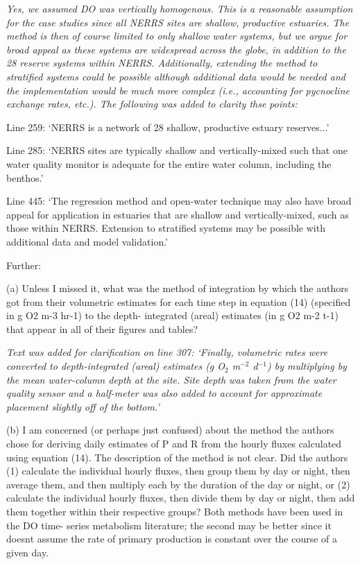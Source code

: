 \documentclass[letterpaper,12pt]{article}\usepackage[]{graphicx}\usepackage[]{color}
\begin{document}
{\it Yes, we assumed DO was vertically homogenous.  This is a reasonable assumption for the case studies since all NERRS sites are shallow, productive estuaries.  The method is then of course limited to only shallow water systems, but we argue for broad appeal as these systems are widespread across the globe, in addition to the 28 reserve systems within NERRS.  Additionally, extending the method to stratified systems could be possible although additional data would be needed and the implementation would be much more complex (i.e., accounting for pycnocline exchange rates, etc.).  The following was added to clarity thse points:

Line 259: `NERRS is a network of 28 shallow, productive estuary reserves...'

Line 285: `NERRS sites are typically shallow and vertically-mixed such that one water quality monitor is adequate for the entire water column, including the benthos.'

Line 445: `The regression method and open-water technique may also have broad appeal for application in estuaries that are shallow and vertically-mixed, such as those within NERRS. Extension to stratified systems may be possible with additional data and model validation.'   
}

Further:

(a) Unless I missed it, what was the method of integration by which the authors got from their volumetric estimates for each time step in equation (14) (specified in g O2 m-3 hr-1) to the depth- integrated (areal) estimates (in g O2 m-2 t-1) that appear in all of their figures and tables?

{\it Text was added for clarification on line 307: `Finally, volumetric rates were converted to depth-integrated (areal) estimates (g O$_2$ m$^{-2}$ d$^{-1}$) by multiplying by the mean water-column depth at the site.  Site depth was taken from the water quality sensor and a half-meter was also added to account for approximate placement slightly off of the bottom.' 
}

(b) I am concerned (or perhaps just confused) about the method the authors chose for deriving daily estimates of P and R from the hourly fluxes calculated using equation (14). The description of the method is not clear. Did the authors (1) calculate the individual hourly fluxes, then group them by day or night, then average them, and then multiply each by the duration of the day or night, or (2) calculate the individual hourly fluxes, then divide them by day or night, then add them together within their respective groups? Both methods have been used in the DO time- series metabolism literature; the second may be better since it doesnt assume the rate of primary production is constant over the course of a given day.
\end{document}
